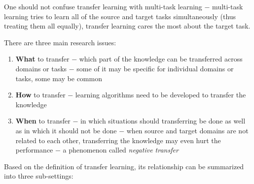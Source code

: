\documentclass[a4paper,twocolumn]{article}
\begin{document}
One should not confuse transfer learning with multi-task learning $-$ multi-task learning tries to learn all of the source and target tasks simultaneously (thus treating them all equally), transfer learning cares the most about the target task.

There are three main research issues:
\begin{enumerate}
    \item \textbf{What} to transfer $-$ which part of the knowledge can be transferred across domains or tasks $-$ some of it may be specific for individual domains or tasks, some may be common
    \item \textbf{How} to transfer $-$ learning algorithms need to be developed to transfer the knowledge
    \item \textbf{When} to transfer $-$ in which situations should transferring be done as well as in which it should not be done $-$ when source and target domains are not related to each other, transferring the knowledge may even hurt the performance $-$ a phenomenon called \textit{negative transfer}
\end{enumerate}
Based on the definition of transfer learning, its relationship can be summarized into three sub-settings:
\end{document}
